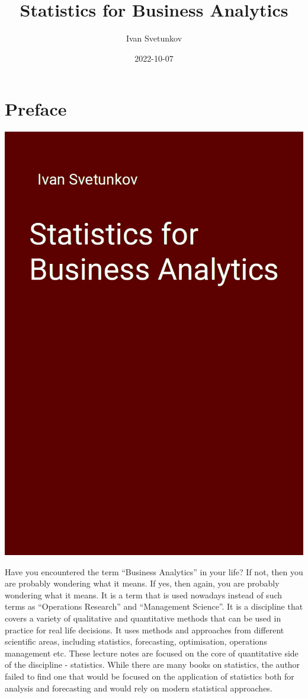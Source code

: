 \documentclass[
]{book}
\title{Statistics for Business Analytics}
\author{Ivan Svetunkov}
\date{2022-10-07}
\theoremstyle{definition}
\theoremstyle{definition}
\theoremstyle{definition}
\theoremstyle{definition}
\theoremstyle{remark}
\begin{document}
\maketitle

{
\setcounter{tocdepth}{1}
\tableofcontents
}
\hypertarget{preface}{%
\chapter*{Preface}\label{preface}}

\begin{center}\includegraphics[width=0.6\linewidth]{images/sba} \end{center}

Have you encountered the term ``Business Analytics'' in your life? If not, then you are probably wondering what it means. If yes, then again, you are probably wondering what it means. It is a term that is used nowadays instead of such terms as ``Operations Research'' and ``Management Science''. It is a discipline that covers a variety of qualitative and quantitative methods that can be used in practice for real life decisions. It uses methods and approaches from different scientific areas, including statistics, forecasting, optimisation, operations management etc. These lecture notes are focused on the core of quantitative side of the discipline - statistics. While there are many books on statistics, the author failed to find one that would be focused on the application of statistics both for analysis and forecasting and would rely on modern statistical approaches.
\end{document}
